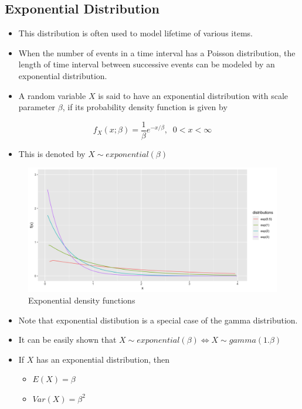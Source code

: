 \documentclass[]{book}
\providecommand{\tightlist}{%
  \setlength{\itemsep}{0pt}\setlength{\parskip}{0pt}}
\begin{document}
\hypertarget{exponential-distribution}{%
\subsection{Exponential Distribution}\label{exponential-distribution}}

\begin{itemize}
\item
  This distribution is often used to model lifetime of various items.
\item
  When the number of events in a time interval has a Poisson distribution, the length of time interval between successive events can be modeled by an exponential distribution.
\item
  A random variable \(X\) is said to have an exponential distribution with scale parameter \(\beta\), if its probability density function is given by
\end{itemize}

\[f_X(x; \beta)=\frac{1}{\beta}e^{-x/\beta},\;\; 0<x<\infty\]

\begin{itemize}
\tightlist
\item
  This is denoted by \(X \sim exponential(\beta)\)
\end{itemize}

\begin{figure}

{\centering \includegraphics{figure/exp-1} 

}

\caption{Exponential density functions}\label{fig:exp}
\end{figure}

\begin{itemize}
\item
  Note that exponential distibution is a special case of the gamma distribution.
\item
  It can be easily shown that \(X\sim exponential(\beta) \iff X\sim gamma (1.\beta)\)
\item
  If \(X\) has an exponential distribution, then

  \begin{itemize}
  \tightlist
  \item
    \(E(X) = \beta\)
  \item
    \(Var(X) = \beta^{2}\)
  \end{itemize}
\end{itemize}
\end{document}
